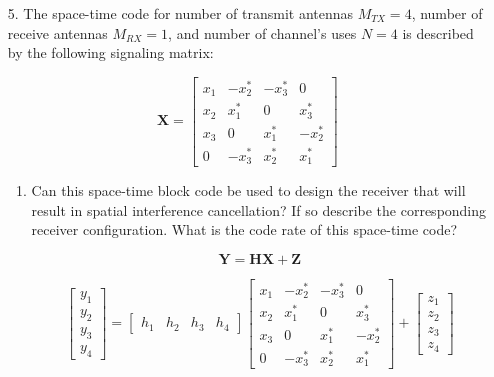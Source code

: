 \documentclass[fleqn]{article}
\makeatletter
\newenvironment{equationCenter}{\@fleqnfalse\begin{equation*}}{\end{equation*}}
\makeatother
\begin{document}
\begin{enumerate}
		\item[5.] The space-time code for number of transmit antennas $M_{TX}=4$, number of receive antennas $M_{RX}=1$, and number of channel's uses $N=4$ is described by the following signaling matrix:
		
		\begin{equationCenter}
			\mathbf{X} = \begin{bmatrix}
				x_1 & -x_2^* & -x_3^* &  0 \\ 
				x_2 &  x_1^* &  0     &  x_3^* \\
				x_3 &  0     &  x_1^* & -x_2^* \\
				0   & -x_3^* &  x_2^* &  x_1^*
			\end{bmatrix}
		\end{equationCenter}
		
		\begin{enumerate}
			\item Can this space-time block code be used to design the receiver that will result in spatial interference cancellation? If so describe the corresponding receiver configuration. What is the code rate of this space-time code?
			
			\begin{equation*}
				\mathbf{Y} = \mathbf{H}\mathbf{X} + \mathbf{Z}
			\end{equation*}
			
			\begin{equation*}
				\begin{bmatrix}
					y_1 \\ y_2 \\ y_3 \\ y_4
				\end{bmatrix} = \begin{bmatrix}
					h_1 & h_2 & h_3 & h_4
				\end{bmatrix}\begin{bmatrix}
					x_1 & -x_2^* & -x_3^* &  0 \\ 
					x_2 &  x_1^* &  0     &  x_3^* \\
					x_3 &  0     &  x_1^* & -x_2^* \\
					0   & -x_3^* &  x_2^* &  x_1^*
				\end{bmatrix} + \begin{bmatrix}
					z_1 \\ z_2 \\ z_3 \\ z_4
				\end{bmatrix}
			\end{equation*}
			

\end{enumerate}
\end{enumerate}
\end{document}
